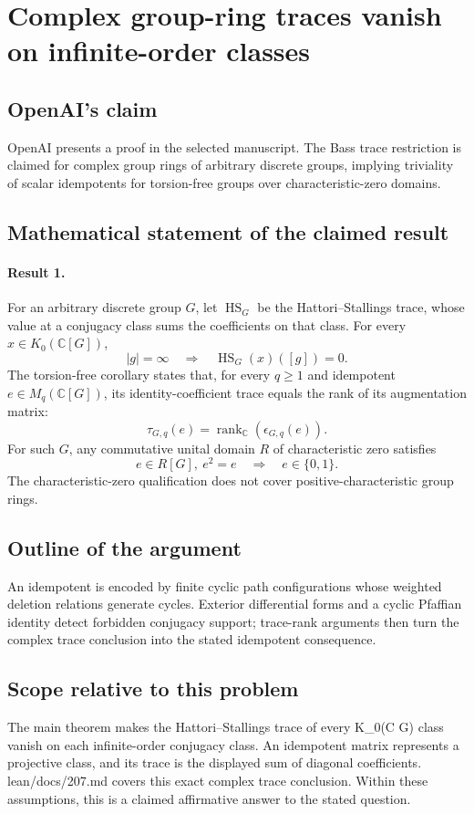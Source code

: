 \documentclass[11pt]{article}
\begin{document}
\section*{Complex group-ring traces vanish on infinite-order classes}

\subsection{OpenAI's claim}
OpenAI presents a proof in the selected manuscript. The Bass trace restriction is claimed for complex group rings of arbitrary discrete groups, implying triviality of scalar idempotents for torsion-free groups over characteristic-zero domains.

\subsection{Mathematical statement of the claimed result}
\paragraph{Result 1.} For an arbitrary discrete group \(G\), let \(\operatorname{HS}_G\) be the Hattori--Stallings trace, whose value at a conjugacy class sums the coefficients on that class. For every \(x\in K_0(\mathbb C[G])\),
\[
 |g|=\infty\quad\Longrightarrow\quad\operatorname{HS}_G(x)([g])=0.
\]
The torsion-free corollary states that, for every \(q\ge1\) and idempotent \(e\in M_q(\mathbb C[G])\), its identity-coefficient trace equals the rank of its augmentation matrix:
\[
 \tau_{G,q}(e)=\operatorname{rank}_{\mathbb C}(\epsilon_{G,q}(e)).
\]
For such \(G\), any commutative unital domain \(R\) of characteristic zero satisfies
\[
 e\in R[G],\ e^2=e\quad\Longrightarrow\quad e\in\{0,1\}.
\]
The characteristic-zero qualification does not cover positive-characteristic group rings.

\subsection{Outline of the argument}
An idempotent is encoded by finite cyclic path configurations whose weighted deletion relations generate cycles. Exterior differential forms and a cyclic Pfaffian identity detect forbidden conjugacy support; trace-rank arguments then turn the complex trace conclusion into the stated idempotent consequence.

\subsection{Scope relative to this problem}
The main theorem makes the Hattori--Stallings trace of every K\_0(C G) class vanish on each infinite-order conjugacy class. An idempotent matrix represents a projective class, and its trace is the displayed sum of diagonal coefficients. lean/docs/207.md covers this exact complex trace conclusion. Within these assumptions, this is a claimed affirmative answer to the stated question.
\end{document}
